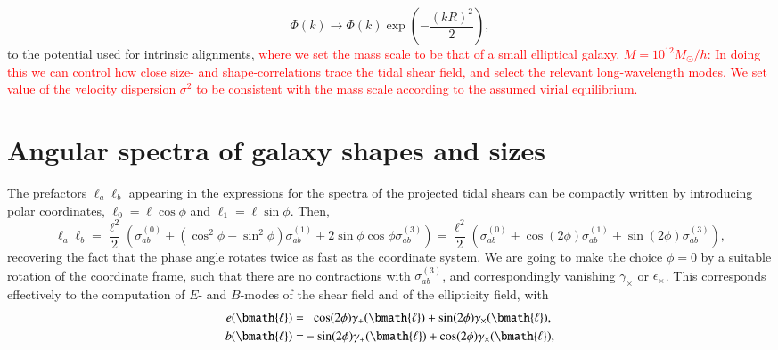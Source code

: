 \documentclass[a4paper,fleqn,usenatbib]{mnras}
\newcommand\spirou[1]{\textcolor{red}{#1}}
\newcommand{\vecl}{\bmath{\ell}}
\begin{document}
\begin{equation}
\Phi(k) \rightarrow \Phi(k)\exp\left(-\frac{(kR)^2}{2}\right),
\end{equation}
to the potential used for intrinsic alignments, \spirou{where we set the mass scale to be that of a small elliptical galaxy, $M=10^{12}M_\odot/h$: In doing this we can control how close size- and shape-correlations trace the tidal shear field, and select the relevant long-wavelength modes. We set value of the velocity dispersion $\sigma^2$ to be consistent with the mass scale according to the assumed virial equilibrium.}


\section{Angular spectra of galaxy shapes and sizes}\label{sect_spectra}
The prefactors $\ell_a\ell_b$ appearing in the expressions for the spectra of the projected tidal shears can be compactly written by introducing polar coordinates, $\ell_0 = \ell\cos\phi$ and $\ell_1 = \ell\sin\phi$. Then,
\begin{equation}
\ell_a\ell_b = 
\frac{\ell^2}{2}\left(\sigma^{(0)}_{ab} + (\cos^2\phi-\sin^2\phi)\sigma^{(1)}_{ab} + 2\sin\phi\cos\phi\sigma^{(3)}_{ab}\right) = 
\frac{\ell^2}{2}\left(\sigma^{(0)}_{ab} + \cos(2\phi)\sigma^{(1)}_{ab} + \sin(2\phi)\sigma^{(3)}_{ab}\right),
\end{equation}
recovering the fact that the phase angle rotates twice as fast as the coordinate system. We are going to make the choice $\phi = 0$ by a suitable rotation of the coordinate frame, such that there are no contractions with $\sigma^{(3)}_{ab}$, and correspondingly vanishing $\gamma_\times$ or $\epsilon_\times$. This corresponds effectively to the computation of $E$- and $B$-modes of the shear field and of the ellipticity field, with
\begin{align}
e(\vecl) = &\hphantom{-}\cos(2\phi)\gamma_+(\vecl) + \sin(2\phi)\gamma_\times(\vecl),\\
b(\vecl) = &-\sin(2\phi)\gamma_+(\vecl) + \cos(2\phi)\gamma_\times(\vecl),
\end{align}
\end{document}
